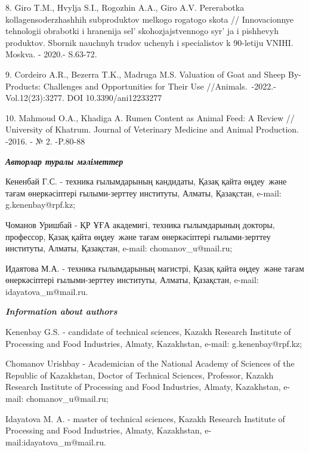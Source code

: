 8. Giro T.M., Hvylja S.I., Rogozhin A.A., Giro A.V. Pererabotka
kollagensoderzhashhih subproduktov melkogo rogatogo skota //
Innovacionnye tehnologii obrabotki i hranenija
sel' skohozjajstvennogo syr' ja i
pishhevyh produktov. Sbornik nauchnyh trudov uchenyh i specialistov k
90-letiju VNIHI. Moskva. - 2020.- S.63-72.

9. Cordeiro A.R., Bezerra T.K., Madruga M.S. Valuation of Goat and Sheep
By-Products: Challenges and Opportunities for Their Use
//Animals.~-2022.-Vol.12(23):3277. DOI 10.3390/ani12233277

10. Mahmoud O.A., Khadiga A. Rumen Content as Animal Feed: A Review //
University of Khatrum. Journal of Veterinary Medicine and Animal
Production. -2016. - № 2. -P.80-88

\emph{{\bfseries Авторлар туралы мәліметтер}}

Кененбай Г.С. - техника ғылымдарының кандидаты, Қазақ қайта өңдеу~және
тағам өнеркәсіптері ғылыми-зерттеу институты, Алматы, Қазақстан, e-mail:
g.kenenbay@rpf.kz;

Чоманов Уришбай - ҚР ҰҒА академигі, техника ғылымдарының докторы,
профессор, Қазақ қайта өңдеу~және тағам өнеркәсіптері ғылыми-зерттеу
институты, Алматы, Қазақстан, e-mail:
chomanov_u@mail.ru;

Идаятова М.А. - техника ғылымдарының магистрі, Қазақ қайта өңдеу~және
тағам өнеркәсіптері ғылыми-зерттеу институты, Алматы, Қазақстан, e-mail:
idayatova_m@mail.ru.

\emph{{\bfseries Information about authors}}

Kenenbay G.S. - candidate of technical sciences, Kazakh Research
Institute of Processing and Food Industries, Almaty, Kazakhstan, e-mail:
g.kenenbay@rpf.kz;

Chomanov Urishbay - Academician of the National Academy of Sciences of
the Republic of Kazakhstan, Doctor of Technical Sciences, Professor,
Kazakh Research Institute of Processing and Food Industries, Almaty,
Kazakhstan, e-mail:
chomanov_u@mail.ru;

Idayatova M. A. - master of technical sciences, Kazakh Research
Institute of Processing and Food Industries, Almaty, Kazakhstan,
e-mail:idayatova_m@mail.ru.\